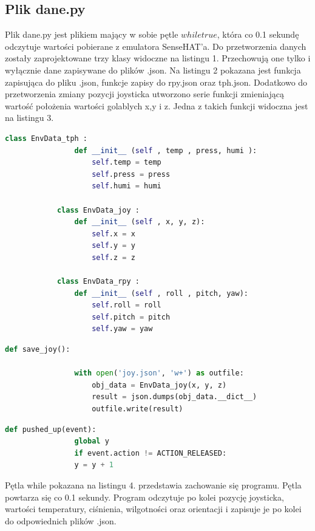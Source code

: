 \documentclass{article}
\begin{document}
		\subsection{Plik dane.py}
			Plik dane.py jest plikiem mający w sobie pętle $while true$, która co 0.1 sekundę odczytuje wartości pobierane z emulatora SenseHAT'a. Do przetworzenia danych zostały zaprojektowane trzy klasy widoczne na listingu 1. Przechowują one tylko i wyłącznie dane zapisywane do plików .json. Na listingu 2 pokazana jest funkcja zapisująca do pliku .json, funkcje zapisy do rpy.json oraz tph.json. Dodatkowo do przetworzenia zmiany pozycji joysticka utworzono serie funkcji zmieniającą wartość położenia wartości golablych x,y i z. Jedna z takich funkcji widoczna jest na listingu 3.
			\begin{lstlisting}[caption={Zaprogramowane klasy}, language=Python, firstnumber=17]
			class EnvData_tph :
				def __init__ (self , temp , press, humi ):
					self.temp = temp
					self.press = press
					self.humi = humi
				
			class EnvData_joy :
				def __init__ (self , x, y, z):
					self.x = x
					self.y = y
					self.z = z
				
			class EnvData_rpy :
				def __init__ (self , roll , pitch, yaw):
					self.roll = roll
					self.pitch = pitch
					self.yaw = yaw
			\end{lstlisting}
			\begin{lstlisting}[caption={Funkcja zapisu pozycji joysticka do pliku joy.json}, language=Python, firstnumber=61]
			def save_joy():
			
				with open('joy.json', 'w+') as outfile:
					obj_data = EnvData_joy(x, y, z)
					result = json.dumps(obj_data.__dict__)
					outfile.write(result)
			\end{lstlisting}
			\begin{lstlisting}[caption={Funkcja przetwarzająca zmiany pozycji joysticka na pozycję "górna"}, language=Python, firstnumber=36]
			def pushed_up(event):
				global y
				if event.action != ACTION_RELEASED:
				y = y + 1
			\end{lstlisting}
			Pętla while pokazana na listingu 4. przedstawia zachowanie się programu. Pętla powtarza się co 0.1 sekundy.
			Program odczytuje po kolei pozycję joysticka, wartości temperatury, ciśnienia, wilgotności oraz orientacji i zapisuje je po kolei do odpowiednich plików .json. 
\end{document}
